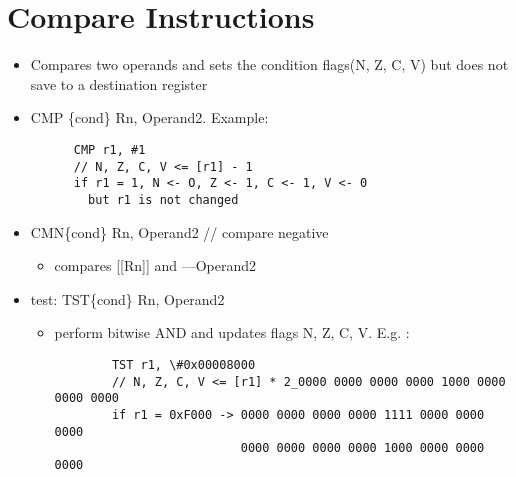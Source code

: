 \documentclass[12pt]{report}
\begin{document}
\section{Compare Instructions}
  \begin{itemize}
    \item Compares two operands and sets the condition flags(N, Z, C, V) but does not
    save to a destination register\\
    \item CMP \{cond\} Rn, Operand2. Example:
    \begin{lstlisting}
      CMP r1, #1
      // N, Z, C, V <= [r1] - 1
      if r1 = 1, N <- O, Z <- 1, C <- 1, V <- 0
        but r1 is not changed
    \end{lstlisting}

    \item CMN\{cond\} Rn, Operand2 // compare negative
    \begin{itemize}
      \item compares [[Rn]] and ---Operand2
    \end{itemize}
    \item test: TST\{cond\} Rn, Operand2
    \begin{itemize}
      \item perform bitwise AND and updates flags N, Z, C, V. E.g. :
      \begin{lstlisting}
        TST r1, \#0x00008000
        // N, Z, C, V <= [r1] * 2_0000 0000 0000 0000 1000 0000 0000 0000
        if r1 = 0xF000 -> 0000 0000 0000 0000 1111 0000 0000 0000
                          0000 0000 0000 0000 1000 0000 0000 0000
      \end{lstlisting}
    \end{itemize}


\end{itemize}
\end{document}
